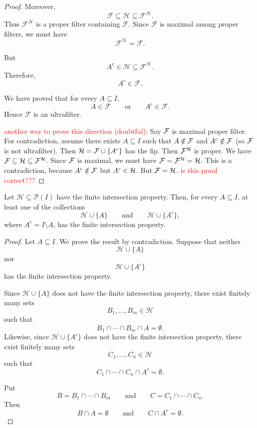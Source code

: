 {\begin{proof}
Moreover,
\[
\mathcal{F}\subseteq\mathcal{H}
\subseteq\mathcal{F}^{\mathcal{H}}.
\]
Thus \(\mathcal{F}^{\mathcal{H}}\) is a proper filter containing
\(\mathcal{F}\). Since \(\mathcal{F}\) is maximal among proper filters, we
must have
\[
\mathcal{F}^{\mathcal{H}}=\mathcal{F}.
\]

But
\[
A^c\in\mathcal{H}\subseteq\mathcal{F}^{\mathcal{H}}.
\]
Therefore,
\[
A^c\in\mathcal{F}.
\]

We have proved that for every \(A\subseteq I\),
\[
A\in\mathcal{F}
\qquad\text{or}\qquad
A^c\in\mathcal{F}.
\]
Hence \(\mathcal{F}\) is an ultrafilter.

\textcolor{red}{another way to prove this direction (doubtful):}
Say $\mathcal{F}$ is maximal proper filter. For contradiction, assume there exists $A \subseteq I$ such that $A \notin \mathcal{F}$ and $A^c \notin \mathcal{F}$ (so $\mathcal{F}$ is not ultrafilter). Then $\mathcal{H}=\mathcal{F} \cup \{A^c\}$ has the fip. Then $\mathcal{F}^{\mathcal{H}}$ is proper. We have $\mathcal{F} \subseteq \mathcal{H} \subseteq \mathcal{F}^{\mathcal{H}}$. Since $\mathcal{F}$ is maximal, we must have $\mathcal{F}=\mathcal{F}^{\mathcal{H}}=\mathcal{H}$. This is a contradiction, because $A^c \notin \mathcal{F}$ but $A^c \in \mathcal{H}$. But $\mathcal{F}=\mathcal{H}$. \textcolor{red}{is this proof correct???}
\end{proof}

\begin{prop}
Let \(\mathcal{H} \subseteq \mathcal{P}(I)\) have the finite intersection
property. Then, for every \(A \subseteq I\), at least one of the collections
\[
\mathcal{H} \cup \{A\}
\qquad\text{and}\qquad
\mathcal{H} \cup \{A^c\},
\]
where \(A^c=I\setminus A\), has the finite intersection property.
\end{prop}

\begin{proof}
Let \(A\subseteq I\). We prove the result by contradiction. Suppose that
neither
\[
\mathcal{H}\cup\{A\}
\]
nor
\[
\mathcal{H}\cup\{A^c\}
\]
has the finite intersection property.

Since \(\mathcal{H}\cup\{A\}\) does not have the finite intersection
property, there exist finitely many sets
\[
B_1,\ldots,B_m\in\mathcal{H}
\]
such that
\[
B_1\cap\cdots\cap B_m\cap A=\emptyset.
\]
Likewise, since \(\mathcal{H}\cup\{A^c\}\) does not have the finite
intersection property, there exist finitely many sets
\[
C_1,\ldots,C_n\in\mathcal{H}
\]
such that
\[
C_1\cap\cdots\cap C_n\cap A^c=\emptyset.
\]

Put
\[
B=B_1\cap\cdots\cap B_m
\qquad\text{and}\qquad
C=C_1\cap\cdots\cap C_n.
\]
Then
\[
B\cap A=\emptyset
\qquad\text{and}\qquad
C\cap A^c=\emptyset.
\]


\end{proof}}
